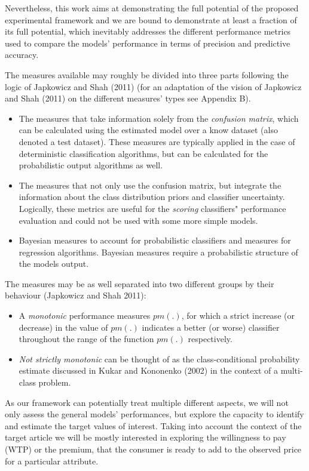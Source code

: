 \documentclass[12pt,]{article}
\providecommand{\tightlist}{%
  \setlength{\itemsep}{0pt}\setlength{\parskip}{0pt}}
\begin{document}
Nevertheless, this work aims at demonstrating the full potential of the
proposed experimental framework and we are bound to demonstrate at least
a fraction of its full potential, which inevitably addresses the
different performance metrics used to compare the models' performance in
terms of precision and predictive accuracy.

The measures available may roughly be divided into three parts following
the logic of Japkowicz and Shah (2011) (for an adaptation of the vision
of Japkowicz and Shah (2011) on the different measures' types see
Appendix B).

\begin{itemize}
\tightlist
\item
  The measures that take information solely from the \emph{confusion
  matrix}, which can be calculated using the estimated model over a know
  dataset (also denoted a test dataset). These measures are typically
  applied in the case of deterministic classification algorithms, but
  can be calculated for the probabilistic output algorithms as well.
\item
  The measures that not only use the confusion matrix, but integrate the
  information about the class distribution priors and classifier
  uncertainty. Logically, these metrics are useful for the
  \emph{scoring} classifiers" performance evaluation and could not be
  used with some more simple models.
\item
  Bayesian measures to account for probabilistic classifiers and
  measures for regression algorithms. Bayesian measures require a
  probabilistic structure of the models output.
\end{itemize}

The measures may be as well separated into two different groups by their
behaviour (Japkowicz and Shah 2011):

\begin{itemize}
\tightlist
\item
  A \emph{monotonic} performance measures \(pm(.)\), for which a strict
  increase (or decrease) in the value of \(pm(.)\) indicates a better
  (or worse) classifier throughout the range of the function \(pm(.)\)
  respectively.
\item
  \emph{Not strictly monotonic} can be thought of as the
  class-conditional probability estimate discussed in Kukar and
  Kononenko (2002) in the context of a multi-class problem.
\end{itemize}

As our framework can potentially treat multiple different aspects, we
will not only assess the general models' performances, but explore the
capacity to identify and estimate the target values of interest. Taking
into account the context of the target article we will be mostly
interested in exploring the willingness to pay (WTP) or the premium,
that the consumer is ready to add to the observed price for a particular
attribute.
\end{document}
